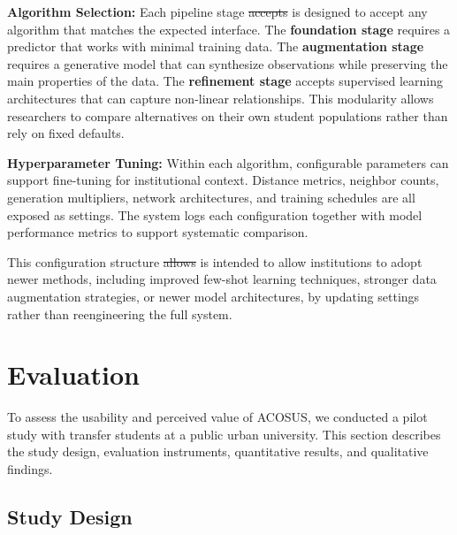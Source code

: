 \documentclass[letterpaper,11pt]{article}
\newcommand{\DIFdel}[1]{%
  \begingroup\setlength{\fboxsep}{0.5pt}%
  \colorbox{diffdelbg}{\textcolor{diffdeltext}{\sout{#1}}}%
  \endgroup}
\newcommand{\DIFadd}[1]{%
  \begingroup\setlength{\fboxsep}{0.5pt}%
  \colorbox{diffaddbg}{\textcolor{diffaddtext}{#1}}%
  \endgroup}
\begin{document}
\textbf{Algorithm Selection:} Each pipeline stage \DIFdel{accepts} \DIFadd{is} \DIFadd{designed} \DIFadd{to} \DIFadd{accept} any algorithm that matches the expected interface. The \textbf{foundation stage} requires a predictor that works with minimal training data. The \textbf{augmentation stage} requires a generative model that can synthesize observations while preserving the main properties of the data. The \textbf{refinement stage} accepts supervised learning architectures that can capture non-linear relationships. This modularity allows researchers to compare alternatives on their own student populations rather than rely on fixed defaults.

\textbf{Hyperparameter Tuning:} Within each algorithm, configurable parameters \DIFadd{can} support fine-tuning for institutional context. Distance metrics, neighbor counts, generation multipliers, network architectures, and training schedules are all exposed as settings. The system logs each configuration together with model performance metrics to support systematic comparison.

This configuration structure \DIFdel{allows} \DIFadd{is} \DIFadd{intended} \DIFadd{to} \DIFadd{allow} institutions to adopt newer methods, including improved few-shot learning techniques, stronger data augmentation strategies, or newer model architectures, by updating settings rather than reengineering the full system.

\section{Evaluation}\label{sec:evaluation}

To assess the usability and perceived value of ACOSUS, we conducted a pilot study with transfer students at a public urban university. This section describes the study design, evaluation instruments, quantitative results, and qualitative findings.

\subsection{Study Design}\label{subsec:studydesign}
\end{document}
